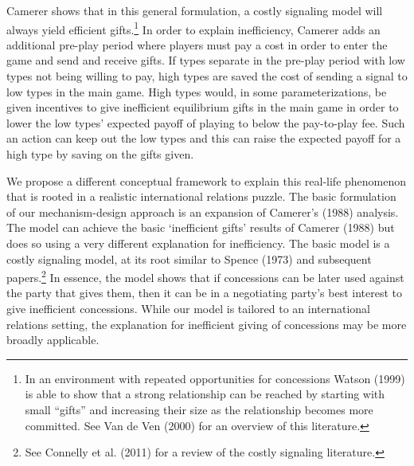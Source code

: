 \documentclass[12pt, letterpaper]{article}
\begin{document}
Camerer shows that in this general formulation, a costly signaling model will always yield efficient gifts.\footnote{In an environment with repeated opportunities for concessions Watson (1999) is able to show that a strong relationship can be reached by starting with small ``gifts'' and increasing their size as the relationship becomes more committed. See Van de Ven (2000) for an overview of this literature.} In order to explain inefficiency, Camerer adds an additional pre-play period where players must pay a cost in order to enter the game and send and receive gifts. If types separate in the pre-play period with low types not being willing to pay, high types are saved the cost of sending a signal to low types in the main game.  High types would, in some parameterizations, be given incentives to give inefficient equilibrium gifts in the main game in order to lower the low types' expected payoff of playing to below the pay-to-play fee. Such an action can keep out the low types and this can raise the expected payoff for a high type by saving on the gifts given. 


We propose a different conceptual framework to explain this real-life phenomenon that is rooted in a realistic international relations puzzle. The basic formulation of our mechanism-design approach is an expansion of Camerer's (1988) analysis. The model can achieve the basic `inefficient gifts' results of Camerer (1988) %
but does so using a very different explanation for inefficiency. The basic model is a costly signaling model, at its root similar to Spence (1973) and subsequent papers.\footnote{See Connelly et al. (2011) for a review of the costly signaling literature.} In essence, the model shows that if concessions can be later used against the party that gives them, then it can be in a negotiating party's best interest to give inefficient concessions. While our model is tailored to an international relations setting, the explanation for inefficient giving of concessions may be more broadly applicable.   
\end{document}
